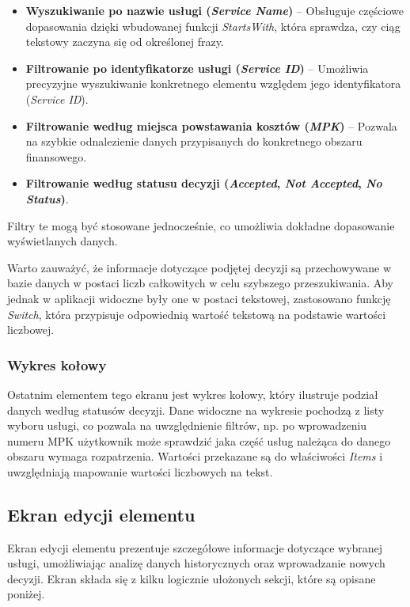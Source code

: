 \begin{itemize}
    \item \textbf{Wyszukiwanie po nazwie usługi (\emph{Service Name})} -- Obsługuje częściowe dopasowania dzięki wbudowanej funkcji \emph{StartsWith}, która sprawdza, czy ciąg tekstowy zaczyna się od określonej frazy.
    \item \textbf{Filtrowanie po identyfikatorze usługi (\emph{Service ID})} -- Umożliwia precyzyjne wyszukiwanie konkretnego elementu względem jego identyfikatora (\emph{Service ID}).
    \item \textbf{Filtrowanie według miejsca powstawania kosztów (\emph{MPK})} -- Pozwala na szybkie odnalezienie danych przypisanych do konkretnego obszaru finansowego.
    \item \textbf{Filtrowanie według statusu decyzji (\emph{Accepted}, \emph{Not Accepted}, \emph{No Status})}.
\end{itemize}

Filtry te mogą być stosowane jednocześnie, co umożliwia dokładne dopasowanie wyświetlanych danych.

Warto zauważyć, że informacje dotyczące podjętej decyzji są przechowywane w bazie danych w postaci liczb całkowitych w celu szybszego przeszukiwania. Aby jednak w aplikacji widoczne były one w postaci tekstowej, zastosowano funkcję \emph{Switch}, która przypisuje odpowiednią wartość tekstową na podstawie wartości liczbowej.

\subsubsection*{Wykres kołowy}
\par
Ostatnim elementem tego ekranu jest wykres kołowy, który ilustruje podział danych według statusów decyzji.
Dane widoczne na wykresie pochodzą z listy wyboru usługi, co pozwala na uwzględnienie filtrów, np. po wprowadzeniu numeru MPK użytkownik może sprawdzić jaka część usług należąca do danego obszaru wymaga rozpatrzenia. Wartości przekazane są do właściwości \emph{Items} i uwzględniają mapowanie wartości liczbowych na tekst.



\subsection{Ekran edycji elementu}

Ekran edycji elementu prezentuje szczegółowe informacje dotyczące wybranej usługi, umożliwiając analizę danych historycznych oraz wprowadzanie nowych decyzji. Ekran składa się z kilku logicznie ułożonych sekcji, które są opisane poniżej.


